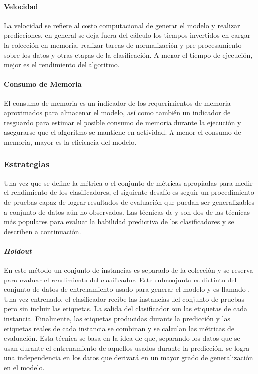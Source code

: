 \paragraph{Velocidad}

La velocidad se refiere al costo computacional de generar el modelo y realizar
predicciones, en general se deja fuera del cálculo los tiempos invertidos en
cargar la colección en memoria, realizar tareas de normalización y
pre-procesamiento sobre los datos y otras etapas de la clasificación. A menor el
tiempo de ejecución, mejor es el rendimiento del algoritmo.

\paragraph{Consumo de Memoria}

El consumo de memoria es un indicador de los requerimientos de memoria
aproximados para almacenar el modelo, así como también un indicador de resguardo
para estimar el posible consumo de memoria durante la ejecución y asegurarse que
el algoritmo se mantiene en actividad. A menor el consumo de memoria, mayor es
la eficiencia del modelo.

\subsubsection{Estrategias}
\label{evaluacion_estrategias}

Una vez que se define la métrica o el conjunto de métricas apropiadas para
medir el rendimiento de los clasificadores, el siguiente desafío es seguir un
procedimiento de pruebas capaz de lograr resultados de evaluación que puedan ser
generalizables a conjunto de datos aún no observados. Las técnicas de
 y  son dos de las
técnicas más populares para evaluar la habilidad predictiva de los
clasificadores y se describen a continuación.


\paragraph{\textit{Holdout}}

En este método un conjunto de instancias es separado de la colección y se
reserva para evaluar el rendimiento del clasificador.  Este subconjunto es
distinto del conjunto de datos de entrenamiento usado para generar el modelo y
es llamado . Una vez entrenado,
el clasificador recibe las instancias del conjunto de pruebas pero sin incluir
las etiquetas. La salida del clasificador son las etiquetas de cada instancia.
Finalmente, las etiquetas producidas durante la predicción y las etiquetas
reales de cada instancia se combinan y se calculan las métricas de evaluación.
Esta técnica se basa en la idea de que, separando los datos que se usan durante
el entrenamiento de aquellos usados durante la predicción, se logra una
independencia en los datos que derivará en un mayor grado de generalización en
el modelo.

